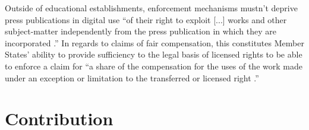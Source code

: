 \documentclass[a4paper]{article}
\begin{document}
\noindent
Outside of educational establishments, enforcement mechanisms mustn't deprive press publications in digital use ``of their right to exploit [...] works and other subject-matter independently from the press publication in which they are incorporated \cite{Copyright Reform}.'' In regards to claims of fair compensation, this constitutes Member States' ability to provide sufficiency to the legal basis of licensed rights to be able to enforce a claim for ``a share of the compensation for the uses of the work made under an exception or limitation to the transferred or licensed right \cite{Copyright Reform}.'' 

\newpage
\section{Contribution} 
\end{document}
